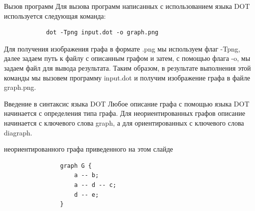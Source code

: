 \documentclass{beamer}
\begin{document}
\begin{frame}[fragile]{Вызов программ}
	Для вызова программ написанных с использованием языка DOT используется следующая команда:
	\newline
	\newline
	\begin{minipage}{0.9\textwidth}
		\begin{verbatim}
			dot -Tpng input.dot -o graph.png
		\end{verbatim}
	\end{minipage}
	\newline
	\newline
	Для получения изображения графа в формате .png мы используем флаг \color{red}-Tpng\color{black}, далее задаем путь к файлу с описанным графом и затем, с помощью флага \color{red}-o\color{black}, мы задаем файл для вывода результата. Таким образом, в результате выполнения этой команды мы вызовем программу input.dot и получим изображение графа в файле graph.png.
\end{frame}

\begin{frame}[fragile]{Введение в синтаксис языка DOT}
	Любое описание графа с помощью языка DOT начинается с определения типа графа. Для неориентированных графов описание начинается с ключевого слова \color{red}graph\color{black}, а для ориентированных с ключевого слова \color{red}diagraph\color{black}.
	\newline
	\newline
	\begin{minipage}{0.5\textwidth}
		 неориентированного графа приведенного на этом слайде
		\begin{verbatim}
				graph G {
				    a -- b;
				    a -- d -- c;
				    d -- e;
				}
		\end{verbatim}
	\end{minipage}
	\hfill
	\begin{minipage}{0.45\textwidth}
	\end{minipage}
\end{frame} 
\end{document}
